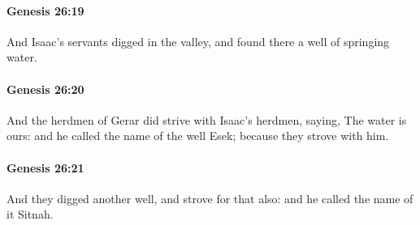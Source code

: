 		\paragraph{Genesis 26:19} %
			\label{GENESIS-26-19}

			And Isaac's servants digged in the valley, and found there a well of springing water.


		\paragraph{Genesis 26:20} %
			\label{GENESIS-26-20}

			And the herdmen of Gerar did strive with Isaac's herdmen, saying, The water is ours: and he called the name of the well Esek; because they strove with him.


		\paragraph{Genesis 26:21} %
			\label{GENESIS-26-21}

			And they digged another well, and strove for that also: and he called the name of it Sitnah.


